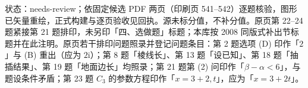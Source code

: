 

状态：needs-review；依固定候选 PDF 两页（印刷页 541–542）逐题核验，图形已矢量重绘，正式构建与逐页验收见回执。源未标分值，不补分值。原页第 22–24 题紧接第 21 题排印，未另印「四、选做题」标题；本库按 2008 同版式补出节标题并在此注明。原页若干排印问题照录并登记问题条目：第 2 题选项 (D) 印作「$2$」与 (B) 重出（应为 $2\mathrm i$）；第 8 题「棱线长」、第 13 题「设已知」、第 18 题「抽插结果」、第 19 题「地面边长」均照录；第 21 题第 (2) 问印作「$\beta-\alpha<6$」，与题设条件矛盾；第 23 题 $C_3$ 的参数方程印作「$x=3+2,t$」，应为「$x=3+2t$」。


